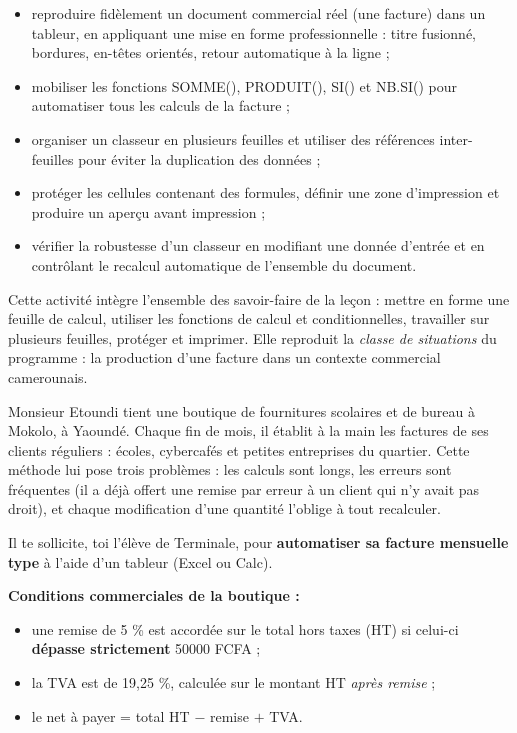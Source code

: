 \documentclass[11pt]{article}
\newcommand{\cle}[1]{{\popxbold\color{popdark}#1}}
\newcounter{popsec}
\newcounter{popsub}
\newcommand{\courssub}[1]{%
  \stepcounter{popsub}%
  \par\vspace{9pt}\noindent{\popxbold\fontsize{11.5}{13}\selectfont\color{popink}{\color{poporange}\thepopsec.\thepopsub}\hspace{6pt}#1}\par\nopagebreak\vspace{4pt}
}
\begin{document}
\begin{itemize}
\item reproduire fidèlement un document commercial réel (une facture) dans un tableur, en appliquant une mise en forme professionnelle : titre fusionné, bordures, en-têtes orientés, retour automatique à la ligne ;
\item mobiliser les fonctions \cle{SOMME()}, \cle{PRODUIT()}, \cle{SI()} et \cle{NB.SI()} pour automatiser tous les calculs de la facture ;
\item organiser un classeur en plusieurs feuilles et utiliser des \cle{références inter-feuilles} pour éviter la duplication des données ;
\item \cle{protéger} les cellules contenant des formules, définir une \cle{zone d'impression} et produire un aperçu avant impression ;
\item vérifier la robustesse d'un classeur en modifiant une donnée d'entrée et en contrôlant le recalcul automatique de l'ensemble du document.
\end{itemize}

\begin{aretenir}
Cette activité intègre l'ensemble des savoir-faire de la leçon : mettre en forme une feuille de calcul, utiliser les fonctions de calcul et conditionnelles, travailler sur plusieurs feuilles, protéger et imprimer. Elle reproduit la \emph{classe de situations} du programme : la production d'une facture dans un contexte commercial camerounais.
\end{aretenir}

\courssub{Situation}

Monsieur Etoundi tient une boutique de fournitures scolaires et de bureau à Mokolo, à Yaoundé. Chaque fin de mois, il établit à la main les factures de ses clients réguliers : écoles, cybercafés et petites entreprises du quartier. Cette méthode lui pose trois problèmes : les calculs sont longs, les erreurs sont fréquentes (il a déjà offert une remise par erreur à un client qui n'y avait pas droit), et chaque modification d'une quantité l'oblige à tout recalculer.

Il te sollicite, toi l'élève de Terminale, pour \textbf{automatiser sa facture mensuelle type} à l'aide d'un tableur (Excel ou Calc).

\textbf{Conditions commerciales de la boutique :}

\begin{itemize}
\item une \cle{remise} de 5 \% est accordée sur le total hors taxes (HT) si celui-ci \textbf{dépasse strictement} \num{50000} FCFA ;
\item la \cle{TVA} est de 19,25 \%, calculée sur le montant HT \emph{après remise} ;
\item le \cle{net à payer} = total HT $-$ remise $+$ TVA.
\end{itemize}
\end{document}
